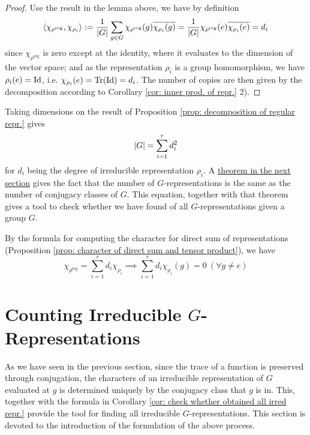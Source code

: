 \documentclass{article}
\begin{document}
\begin{proof}
    Use the result in the lemma above, we have by definition
    \[
        \left\langle \chi_{\rho^{\mathrm{reg}}}, \chi_{\rho_i} \right\rangle := \frac{1}{\left|G\right|} \sum_{g \in G} \chi_{\rho^{\mathrm{reg}}}(g) \overline{\chi_{\rho_i}(g)} = \frac{1}{\left|G\right|} \chi_{\rho^{\mathrm{reg}}}(e) \overline{\chi_{\rho_i}(e)} = d_i
    \]
    since $\chi_{\rho^{\mathrm{reg}}}$ is zero except at the identity, where it evaluates to the dimension of the vector space; and as the representation $\rho_i$ is a group homomorphism, we have $\rho_i(e) = \mathrm{Id}$, i.e. $\chi_{\rho_i}(e) = \operatorname{Tr}(\mathrm{Id}) = d_i$. The number of copies are then given by the decomposition according to Corollary \ref{cor: inner prod. of repr.} 2).
\end{proof}

\begin{corollary}\label{cor: check whether obtained all irred repr.}
    Taking dimensions on the result of Proposition \ref{prop: decomposition of regular repr.} gives
    \[
        \left|G\right| = \sum_{i = 1}^r d_i^2
    \]
    for $d_i$ being the degree of irreducible representation $\rho_i$. A \hyperref[thm: character of irred repres gives a basis of C(G)]{theorem in the next section} gives the fact that the number of $G$-representations is the same as the number of conjugacy classes of $G$. This equation, together with that theorem gives a tool to check whether we have found of all $G$-representations given a group $G$. 
\end{corollary}

\begin{corollary}
    By the formula for computing the character for direct sum of representations (Proposition \ref{prop: character of direct sum and tensor product}), we have 
    \[
        \chi_{\rho^{\mathrm{reg}}} = \sum_{i = 1}^r d_i \chi_{\rho_i} \implies \sum_{i = 1}^r d_i \chi_{\rho_i}(g) = 0\ (\forall g \neq e)
    \]
\end{corollary}

\section{Counting Irreducible $G$-Representations}

\textstart
As we have seen in the previous section, since the trace of a function is preserved through conjugation, the characters of an irreducible representation of $G$ evaluated at $g$ is determined uniquely by the conjugacy class that $g$ is in. This, together with the formula in Corollary \ref{cor: check whether obtained all irred repr.} provide the tool for finding all irreducible $G$-representations. This section is devoted to the introduction of the formulation of the above process.
\end{document}
